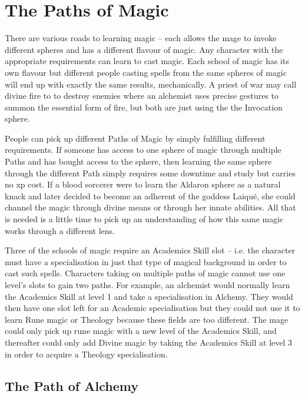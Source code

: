 \chapter{The Paths of Magic}
\label{magic_paths}

\begin{multicols}{2}

There are various roads to learning magic -- each allows the mage to invoke different spheres and has a different flavour of magic.
Any character with the appropriate requirements can learn to cast magic.
Each school of magic has its own flavour but different people casting spells from the same spheres of magic will end up with exactly the same results, mechanically.
A priest of war may call divine fire to to destroy enemies where an alchemist uses precise gestures to summon the essential form of fire, but both are just using the the Invocation sphere.

People can pick up different Paths of Magic by simply fulfilling different requirements. If someone has access to one sphere of magic through multiple Paths and has bought access to the sphere, then learning the same sphere through the different Path simply requires some \gls{downtime} and study but carries no \gls{xp} cost. If a blood sorcerer were to learn the Aldaron sphere as a natural knack and later decided to become an adherent of the goddess Laiqu\"{e}, she could channel the magic through divine means or through her innate abilities.
All that is needed is a little time to pick up an understanding of how this same magic works through a different lens.

Three of the schools of magic require an Academics Skill slot -- i.e. the character must have a specialisation in just that type of magical background in order to cast such spells. Characters taking on multiple paths of magic cannot use one level's slots to gain two paths. For example, an alchemist would normally learn the Academics Skill at level 1 and take a specialisation in Alchemy. They would then have one slot left for an Academic specialisation but they could not use it to learn Rune magic or Theology because these fields are too different. The mage could only pick up rune magic with a new level of the Academics Skill, and thereafter could only add Divine magic by taking the Academics Skill at level 3 in order to acquire a Theology specialisation.

\end{multicols}

\section{The Path of Alchemy}

